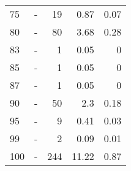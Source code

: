\begin{longtable}{lXrrr}
        75 & \multicolumn{1}{X}{-} & %
          \num{19} &
          \num[round-mode=places,round-precision=2]{0,87} &
          \num[round-mode=places,round-precision=2]{0,07} \\

        80 & \multicolumn{1}{X}{-} & %
          \num{80} &
          \num[round-mode=places,round-precision=2]{3,68} &
          \num[round-mode=places,round-precision=2]{0,28} \\

        83 & \multicolumn{1}{X}{-} & %
          \num{1} &
          \num[round-mode=places,round-precision=2]{0,05} &
          \num[round-mode=places,round-precision=2]{0} \\

        85 & \multicolumn{1}{X}{-} & %
          \num{1} &
          \num[round-mode=places,round-precision=2]{0,05} &
          \num[round-mode=places,round-precision=2]{0} \\

        87 & \multicolumn{1}{X}{-} & %
          \num{1} &
          \num[round-mode=places,round-precision=2]{0,05} &
          \num[round-mode=places,round-precision=2]{0} \\

        90 & \multicolumn{1}{X}{-} & %
          \num{50} &
          \num[round-mode=places,round-precision=2]{2,3} &
          \num[round-mode=places,round-precision=2]{0,18} \\

        95 & \multicolumn{1}{X}{-} & %
          \num{9} &
          \num[round-mode=places,round-precision=2]{0,41} &
          \num[round-mode=places,round-precision=2]{0,03} \\

        99 & \multicolumn{1}{X}{-} & %
          \num{2} &
          \num[round-mode=places,round-precision=2]{0,09} &
          \num[round-mode=places,round-precision=2]{0,01} \\

        100 & \multicolumn{1}{X}{-} & %
          \num{244} &
          \num[round-mode=places,round-precision=2]{11,22} &
          \num[round-mode=places,round-precision=2]{0,87} \\


\end{longtable}
